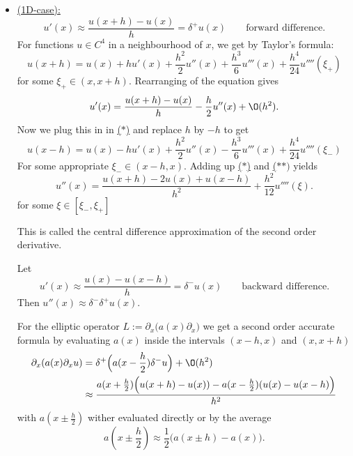 \begin{itemize}
	\item \underline{(1D-case):} 
		\[
			u'(x) \approx \frac{u(x+h)-u(x)}{h} = \delta^{+}u(x) \qquad \text{forward difference}
		.\] 
		For functions $u \in C^{4}$ in a neighbourhood of $x$, we get by Taylor's formula:
		\begin{equation} \label{eq:eq_3} \tag{$\ast$}
			u(x+h) = u(x) + h u'(x) + \frac{h^{2}}{2} u''(x) + \frac{h^{3}}{6}u'''(x) + \frac{h^{4}}{24}u''''(\xi_{+})	
		\end{equation}
		for some $\xi_{+} \in (x, x+h)$. Rearranging of the equation gives
		\[
			u'(x) = \frac{u(x+h)-u(x)}{h}-\frac{h}{2}u''(x) + \O(h^{2})
		.\] 
		Now we plug this in in \href{eq:eq_4}{($\ast$)} and replace $h$ by $-h$ to get
		\begin{equation} \label{eq:eq_4} \tag{$\ast \ast$}
			u(x-h) = u(x) - hu'(x) + \frac{h^{2}}{2}u''(x)- \frac{h^{3}}{6} u'''(x) + \frac{h^{4}}{24}u''''(\xi _{-})
		\end{equation}
		For some appropriate $\xi _{-} \in (x-h, x)$.
		Adding up \href{eq:eq_3}{($\ast$)} and \href{eq:eq_4}{($\ast \ast)$} yields
		\[
			u''(x)= \frac{u(x+h) - 2u(x) + u(x-h)}{h^{2}} + \frac{h^{2}}{12}u''''(\xi )
		.\] for some $\xi  \in [\xi _{-}, \xi _{+}]$

		This is called the central difference approximation of the second order derivative.
		
		Let
		\[
			u'(x) \approx \frac{u(x)-u(x-h)}{h} = \delta^{-}u(x) \qquad \text{backward difference}
		.\] Then $u''(x) \approx \delta^{-}\delta^{+}u(x)$.

		For the elliptic operator $L:=\partial_{x} \Big(a(x)\partial_{x}\Big)$ we get a second order accurate formula by evaluating $a(x)$ inside the intervals $(x-h, x)$ and $(x, x+h)$
		\begin{align*}
			\partial_{x}(a(x) \partial_{x}u) &=
			\delta^{+}\Big(a(x- \frac{h}{2}) \delta^{-} u\Big) + \O(h^{2}) \\
											 &\approx \frac{a(x+\frac{h}{2})\Big(u(x+h)-u(x))-a(x-\frac{h}{2})(u(x)-u(x-h)\Big)}{h^{2}}
		\end{align*}
		with $a(x \pm \frac{h}{2})$ wither evaluated directly or by the average
		\[
			a(x \pm \frac{h}{2}) \approx \frac{1}{2}\Big(a(x \pm h) - a(x)\Big)
		.\] 
		

\end{itemize}
